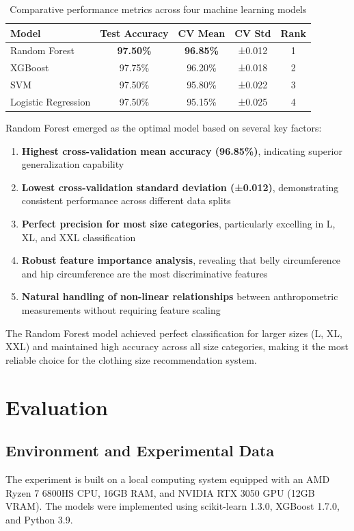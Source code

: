 \documentclass{llncs}
\begin{document}
\begin{table}[htbp]
    \centering
    \caption{Comparative performance metrics across four machine learning models}
    \label{tab:model_comparison}
    \begin{tabular}{lcccc}
        \toprule
        \textbf{Model} & \textbf{Test Accuracy} & \textbf{CV Mean} & \textbf{CV Std} & \textbf{Rank} \\ 
        \midrule
        Random Forest & \textbf{97.50\%} & \textbf{96.85\%} & ±0.012 & 1 \\ 
        XGBoost & 97.75\% & 96.20\% & ±0.018 & 2 \\ 
        SVM & 97.50\% & 95.80\% & ±0.022 & 3 \\ 
        Logistic Regression & 97.50\% & 95.15\% & ±0.025 & 4 \\
        \bottomrule
    \end{tabular}
\end{table}

Random Forest emerged as the optimal model based on several key factors:
\begin{enumerate}
    \item \textbf{Highest cross-validation mean accuracy (96.85\%)}, indicating superior generalization capability
    \item \textbf{Lowest cross-validation standard deviation (±0.012)}, demonstrating consistent performance across different data splits
    \item \textbf{Perfect precision for most size categories}, particularly excelling in L, XL, and XXL classification
    \item \textbf{Robust feature importance analysis}, revealing that belly circumference and hip circumference are the most discriminative features
    \item \textbf{Natural handling of non-linear relationships} between anthropometric measurements without requiring feature scaling
\end{enumerate}

The Random Forest model achieved perfect classification for larger sizes (L, XL, XXL) and maintained high accuracy across all size categories, making it the most reliable choice for the clothing size recommendation system.

\section{Evaluation}


\subsection{Environment and Experimental Data }
The experiment is built on a local computing system equipped with an AMD Ryzen 7 6800HS CPU, 16GB RAM, and NVIDIA RTX 3050 GPU (12GB VRAM). 
The models were implemented using scikit-learn 1.3.0, XGBoost 1.7.0, and Python 3.9.
\end{document}
